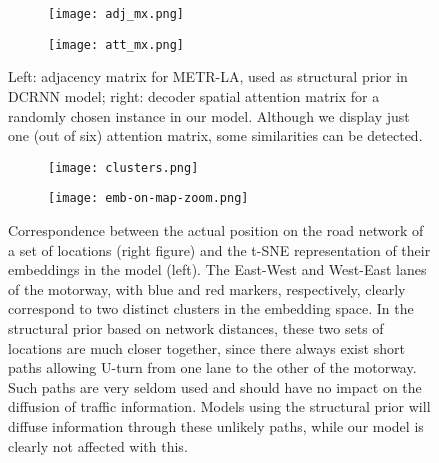 \documentclass[a4paper]{article}
\begin{document}
\begin{figure}[h]
    \begin{subfigure}{.5\textwidth}
    \centering
    \texttt{[image: adj\_mx.png]}
    \end{subfigure}
    \begin{subfigure}{.5\textwidth}
    \centering
    \texttt{[image: att\_mx.png]}
    \end{subfigure}
  \caption{\label{fig:adj-matrix} Left: adjacency matrix for METR-LA, used as structural prior in DCRNN model; right: decoder spatial attention matrix for a randomly chosen instance in our model. Although we display just one (out of six) attention matrix, some similarities can be detected.}
\end{figure}


\begin{figure}[h]
    \begin{subfigure}{.5\textwidth}
    \centering
    \texttt{[image: clusters.png]}
    \end{subfigure}
    \begin{subfigure}{.5\textwidth}
    \centering
    \texttt{[image: emb-on-map-zoom.png]}
    \end{subfigure}
    \caption{\label{fig:nodes-on-map}Correspondence between the actual position on the road network of a set of locations (right figure) and the t-SNE representation of their embeddings in the model (left). The East-West and West-East lanes of the motorway, with blue and red markers, respectively, clearly correspond to two distinct clusters in the embedding space. In the structural prior based on network distances, these two sets of locations are much closer together, since there always exist short paths allowing U-turn from one lane to the other of the motorway. Such paths are very seldom used and should have no impact on the diffusion of traffic information. Models using the structural prior will diffuse information through these unlikely paths, while our model is clearly not affected with this.}
\end{figure}
\end{document}
